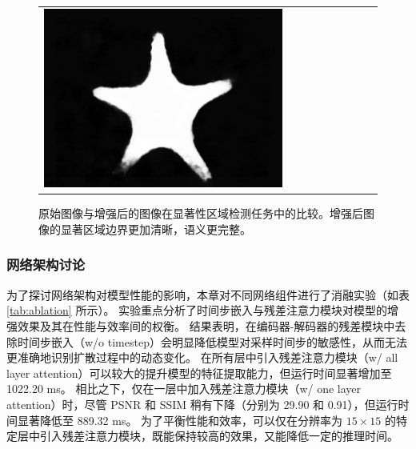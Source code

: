 \begin{figure}[ht]
\begin{center}
\begin{tabular}{ccccccccc}
            \includegraphics[width = 0.10\linewidth, height=0.10\linewidth]{figures/ch3/compare/discussion/SOD/sod/9.png}  \\
		\end{tabular}
	\end{center}
	\caption{\label{img:sod}原始图像与增强后的图像在显著性区域检测任务中的比较。增强后图像的显著区域边界更加清晰，语义更完整。}
	\vspace{-2mm}
\end{figure}     %

\subsubsection{网络架构讨论}
为了探讨网络架构对模型性能的影响，本章对不同网络组件进行了消融实验（如表 \ref{tab:ablation} 所示）。
实验重点分析了时间步嵌入与残差注意力模块对模型的增强效果及其在性能与效率间的权衡。
结果表明，在编码器-解码器的残差模块中去除时间步嵌入（w/o timestep）会明显降低模型对采样时间步的敏感性，从而无法更准确地识别扩散过程中的动态变化。
在所有层中引入残差注意力模块（w/ all layer attention）可以较大的提升模型的特征提取能力，但运行时间显著增加至 1022.20 ms。
相比之下，仅在一层中加入残差注意力模块（w/ one layer attention）时，尽管 PSNR 和 SSIM 稍有下降（分别为 29.90 和 0.91），但运行时间显著降低至 889.32 ms。
为了平衡性能和效率，可以仅在分辨率为 $15 \times 15$ 的特定层中引入残差注意力模块，既能保持较高的效果，又能降低一定的推理时间。
\begin{table}[ht]
    \vspace{-0.4mm}
    \centering
    \caption{\label{tab:ablation}消融实验结果。}
    \vspace{1mm}
\end{table}


